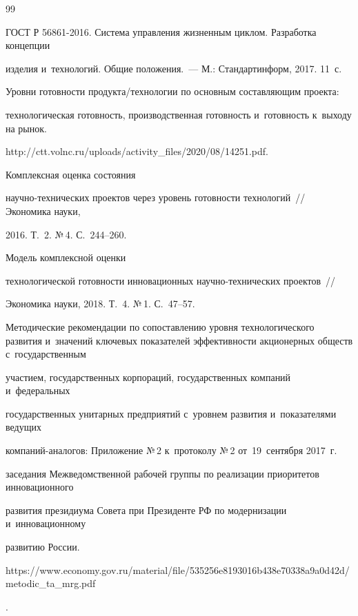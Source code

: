 {{\begin{thebibliography}{99}

  ГОСТ Р 56861-2016. Система управления жизненным цик\-лом. Разработка концепции 

изделия и~технологий. Общие положения.~--- М.: Стандартинформ, 2017. 11~с.


  Уровни готовности продукта/технологии по основным составляющим проекта: 

технологическая го\-тов\-ность, производственная го\-тов\-ность и~го\-тов\-ность к~выходу на рынок. 

{\sf http://ctt.volnc.ru/uploads/activity\_files/2020/08/14251.pdf}.


    Комплексная оценка состояния 

на\-уч\-но-тех\-ни\-че\-ских проектов через уровень го\-тов\-ности технологий~/\!\!/ Экономика науки, 

2016. Т.~2. №\,4. С.~244--260.


    Модель комплексной оценки 

технологической готовности инновационных на\-уч\-но-тех\-ни\-че\-ских проектов~/\!\!/ 

Экономика науки, 2018. Т.~4. №\,1. С.~47--57.


  Методические рекомендации по сопоставлению уровня технологического развития и~значений ключевых показателей эффективности акционерных обществ с~государственным 

участием, государственных корпораций, государственных компаний и~федеральных 

государственных унитарных предприятий с~уровнем развития и~показателями ведущих 

компаний-ана\-ло\-гов: Приложение №\,2 к~протоколу №\,2 от~19~сентября 2017~г.\ 

заседания Межведомственной рабочей группы по реализации приоритетов инновационного 

развития президиума Совета при Президенте РФ по модернизации и~инновационному 

развитию России. {\sf 

https://www.economy.\linebreak gov.ru/material/file/535256e8193016b438e70338a9a0d42d/metodic\_ta\_mrg.pdf}.



       \end{thebibliography}

} }







